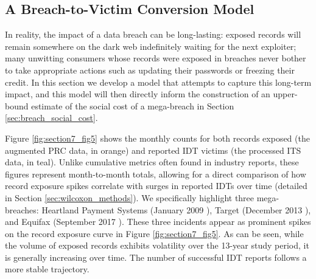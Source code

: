 


\subsection{A Breach-to-Victim Conversion Model}
\label{sec:conversion_rate}

In reality, the impact of a data breach can be long-lasting: exposed records will remain somewhere on the dark web indefinitely waiting for the next exploiter; many unwitting consumers whose records were exposed in breaches never bother to take appropriate actions such as updating their passwords or freezing their credit. In this section we develop a model that attempts to capture this long-term impact, and this model will then directly inform the construction of an upper-bound estimate of the social cost of a mega-breach in Section \ref{sec:breach_social_cost}.

Figure \ref{fig:section7_fig5} shows the monthly counts for both records exposed (the augmented PRC data, in orange) and reported IDT victims (the processed ITS data, in teal). 
Unlike cumulative metrics often found in industry reports, these figures represent month-to-month totals, allowing for a direct comparison of how record exposure spikes correlate with surges in reported IDTs over time (detailed in Section \ref{sec:wilcoxon_methods}). We specifically highlight three mega-breaches: Heartland Payment Systems (January 2009 \cite{USCourts_Heartland}), Target (December 2013 \cite{Target_Breach}), and Equifax (September 2017 \cite{House_Equifax}). These three incidents appear as prominent spikes on the record exposure curve in Figure \ref{fig:section7_fig5}. As can be seen, while the volume of exposed records exhibits volatility over the 13-year study period, it is generally increasing over time. 
The number of successful IDT reports follows a more stable trajectory. 

